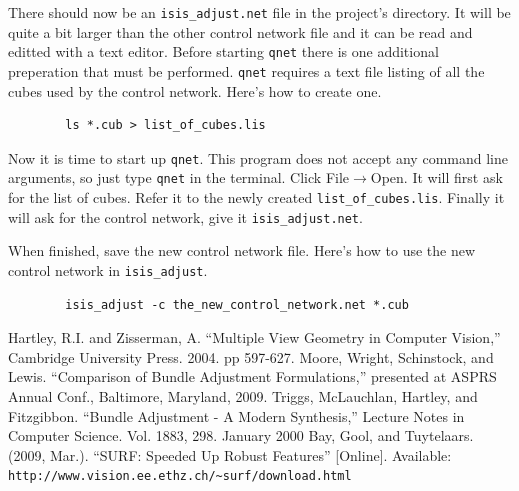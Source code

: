 There should now be an \verb=isis_adjust.net= file in the project's
directory. It will be quite a bit larger than the other control
network file and it can be read and editted with a text editor. Before
starting \texttt{qnet} there is one additional preperation that must
be performed. \texttt{qnet} requires a text file listing of all the
cubes used by the control network. Here's how to create one.

\begin{verbatim}
        ls *.cub > list_of_cubes.lis
\end{verbatim}

Now it is time to start up \texttt{qnet}. This program does not accept
any command line arguments, so just type \texttt{qnet} in the
terminal. Click File$\rightarrow$Open. It will first ask for the list
of cubes. Refer it to the newly created
\verb=list_of_cubes.lis=. Finally it will ask for the control network,
give it \verb=isis_adjust.net=.

\begin{center}
\end{center}

When finished, save the new control network file. Here's how to use
the new control network in \texttt{isis\_adjust}.

\begin{verbatim}
        isis_adjust -c the_new_control_network.net *.cub
\end{verbatim}

\begin{thebibliography}{1}

 Hartley, R.I. and Zisserman, A. ``Multiple View Geometry in Computer Vision,''
  Cambridge University Press. 2004. pp 597-627.
 Moore, Wright, Schinstock, and Lewis. ``Comparison of Bundle Adjustment Formulations,''
  presented at ASPRS Annual Conf., Baltimore, Maryland, 2009.
 Triggs, McLauchlan, Hartley, and Fitzgibbon. ``Bundle Adjustment - A Modern Synthesis,''
  Lecture Notes in Computer Science. Vol. 1883, 298. January 2000
 Bay, Gool, and Tuytelaars. (2009, Mar.). ``SURF: Speeded Up Robust Features'' [Online]. Available: \verb!http://www.vision.ee.ethz.ch/~surf/download.html!

\end{thebibliography}
